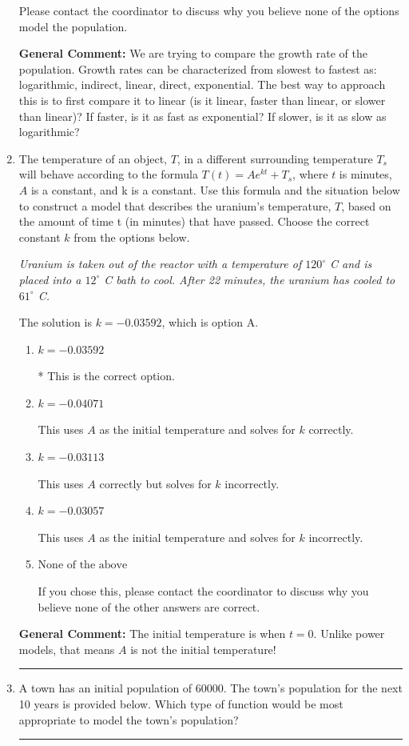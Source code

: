 \documentclass{extbook}[14pt]
\newcommand{\litem}[1]{\item #1

\rule{\textwidth}{0.4pt}}
\begin{document}
\begin{enumerate}
{\begin{enumerate}[label=\Alph*.]
Please contact the coordinator to discuss why you believe none of the options model the population.
\end{enumerate}

\textbf{General Comment:} We are trying to compare the growth rate of the population. Growth rates can be characterized from slowest to fastest as: logarithmic, indirect, linear, direct, exponential. The best way to approach this is to first compare it to linear (is it linear, faster than linear, or slower than linear)? If faster, is it as fast as exponential? If slower, is it as slow as logarithmic?
}
\litem{
The temperature of an object, $T$, in a different surrounding temperature $T_s$ will behave according to the formula $T(t) = Ae^{kt} + T_s$, where $t$ is minutes, $A$ is a constant, and k is a constant. Use this formula and the situation below to construct a model that describes the uranium's temperature, $T$, based on the amount of time t (in minutes) that have passed. Choose the correct constant $k$ from the options below.

\begin{center}
    \textit{ Uranium is taken out of the reactor with a temperature of $120^{\circ}$ C and is placed into a $12^{\circ}$ C bath to cool. After 22 minutes, the uranium has cooled to $61^{\circ}$ C. }
\end{center}
The solution is \( k = -0.03592 \), which is option A.\begin{enumerate}[label=\Alph*.]
\item \( k = -0.03592 \)

* This is the correct option.
\item \( k = -0.04071 \)

This uses $A$ as the initial temperature and solves for $k$ correctly.
\item \( k = -0.03113 \)

This uses $A$ correctly but solves for $k$ incorrectly.
\item \( k = -0.03057 \)

This uses $A$ as the initial temperature and solves for $k$ incorrectly.
\item \( \text{None of the above} \)

If you chose this, please contact the coordinator to discuss why you believe none of the other answers are correct.
\end{enumerate}

\textbf{General Comment:} The initial temperature is when $t = 0$. Unlike power models, that means $A$ is not the initial temperature!
}
\litem{
A town has an initial population of 60000. The town's population for the next 10 years is provided below. Which type of function would be most appropriate to model the town's population?


}
\end{enumerate}
\end{document}
